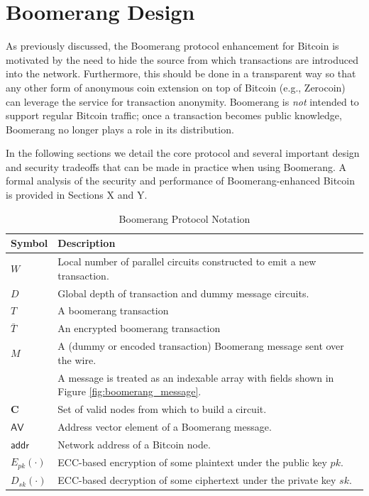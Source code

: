 \section{Boomerang Design} \label{sec:design}

As previously discussed, the Boomerang protocol enhancement for Bitcoin is motivated by the need to hide the source from which transactions are introduced into the network. Furthermore, this should be done in a transparent way so that any other form of anonymous coin extension on top of Bitcoin (e.g., Zerocoin) can leverage the service for transaction anonymity. Boomerang is \emph{not} intended to support regular Bitcoin traffic; once a transaction becomes public knowledge, Boomerang no longer plays a role in its distribution. 

In the following sections we detail the core protocol and several important design and security tradeoffs that can be made in practice when using Boomerang. A formal analysis of the security and performance of Boomerang-enhanced Bitcoin is provided in Sections X and Y. 

\begin{table}[ht!]
\begin{center}
\caption{Boomerang Protocol Notation}
	\begin{tabular}{|l|l|}\hline
	\textbf{Symbol} & \textbf{Description} \\ \hline
	$W$ & Local number of parallel circuits constructed to emit a new transaction. \\
	$D$ & Global depth of transaction and dummy message circuits. \\
	$T$ & A boomerang transaction \\ 
	$\bar{T}$ & An encrypted boomerang transaction \\ 
	$M$ & A (dummy or encoded transaction) Boomerang message sent over the wire. \\
	~ & A message is treated as an indexable array with fields shown in Figure \ref{fig:boomerang_message}. \\
	$\mathbf{C}$ & Set of valid nodes from which to build a circuit. \\
	$\mathsf{AV}$ & Address vector element of a Boomerang message. \\
	$\mathsf{addr}$ & Network address of a Bitcoin node. \\
	$E_{pk}(\cdot)$ & ECC-based encryption of some plaintext under the public key $pk$. \\	
	$D_{sk}(\cdot)$ & ECC-based decryption of some ciphertext under the private key $sk$. \\ \hline
	\end{tabular}
\end{center}
\end{table}

